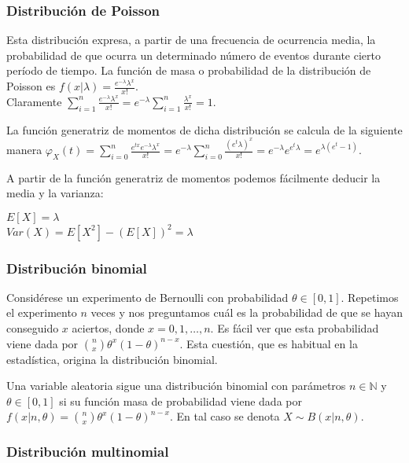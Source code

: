 \documentclass{article}
\begin{document}
\subsubsection{Distribución de Poisson}
Esta distribución expresa, a partir de una frecuencia de ocurrencia media, la probabilidad de que ocurra un determinado número de eventos durante cierto período de tiempo. La función de masa o probabilidad de la distribución de Poisson es $f(x| \lambda) = \frac{e^{-\lambda}{\lambda}^x}{x!}$. \\Claramente $\sum^n_{i=1}  \frac{e^{-\lambda}{\lambda}^x}{x!} = e^{-\lambda} \sum^n_{i=1}  \frac{{\lambda}^x}{x!}  = 1$.


La función generatriz de momentos de dicha distribución se calcula de la siguiente manera $\varphi_X(t) = \sum^n_{i=0} \frac{e^{tx}e^{-\lambda}{\lambda}^x}{x!} = e^{-\lambda} \sum^n_{i=0}   \frac{(e^{t}  \lambda)^x}{x!} =  e^{-\lambda}  e ^{e^{t} \lambda} = e ^{\lambda (e^t -1 )}$.

A partir de la función generatriz de momentos podemos fácilmente deducir la media y la varianza:
\begin{center}
	$E[X] = \lambda $
	\\$Var(X) =  E[X^2] - (E[X])^2 =  \lambda$
\end{center}

\subsubsection{Distribución binomial}

Considérese un experimento de Bernoulli con probabilidad $\theta \in [0,1]$. Repetimos el experimento $n$ veces y nos preguntamos cuál es la probabilidad de que se hayan conseguido $x$ aciertos, donde $x = 0, 1, \ldots, n$. Es fácil ver que esta probabilidad viene dada por $\binom{n}{x} \theta^x (1-\theta)^{n-x}$. Esta cuestión, que es habitual en la estadística, origina la distribución binomial.

\begin{definition}
    Una variable aleatoria sigue una distribución binomial con parámetros $n \in \mathbb{N}$ y $\theta \in [0,1]$  si su función masa de probabilidad viene dada por $f(x|n,\theta) = \binom{n}{x} \theta^x (1-\theta)^{n-x}$. En tal caso se denota $X \sim B(x|n,\theta)$.
\end{definition}

\subsubsection{Distribución multinomial}
\end{document}
